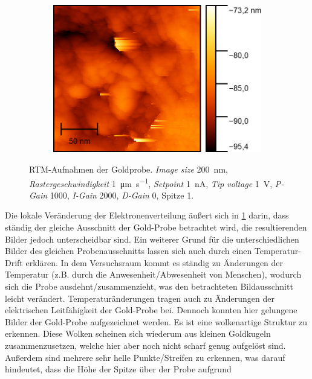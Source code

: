 \begin{figure}[H]
\begin{subfigure}{0.45\textwidth}
        \caption{}
    \end{subfigure}
    \begin{subfigure}{0.45\textwidth}
        \centering
        \includegraphics[width=\linewidth]{../figs/Gold10449}
        \caption{}
    \end{subfigure}
    \caption{RTM-Aufnahmen der Goldprobe. \textit{Image size} \SI{200}{\nano \meter}, \textit{Rastergeschwindigkeit} \SI{1}{\micro\m \per \second}, \textit{Setpoint} \SI{1}{\nano \ampere},
    \textit{Tip voltage} \SI{1}{\volt}, \textit{P-Gain} \num{1000}, \textit{I-Gain} \num{2000}, \textit{D-Gain} \num{0}, Spitze 1.}\label{fig:gold1}
\end{figure}
Die lokale Veränderung der Elektronenverteilung äußert sich in \cref{fig:gold1} darin, dass ständig der gleiche Ausschnitt der Gold-Probe betrachtet wird,
die resultierenden Bilder jedoch unterscheidbar sind. Ein weiterer Grund für die unterschiedlichen Bilder des gleichen Probenausschnitts lassen sich auch
durch einen Temperatur-Drift erklären. In dem Versuchsraum kommt es ständig zu Änderungen der Temperatur (z.B. durch die Anwesenheit/Abwesenheit von Menschen),
wodurch sich die Probe ausdehnt/zusammenzieht, was den betrachteten Bildausschnitt leicht verändert. Temperaturänderungen tragen auch zu Änderungen
der elektrischen Leitfähigkeit der Gold-Probe bei. Dennoch konnten hier gelungene Bilder der Gold-Probe aufgezeichnet werden. Es ist eine
wolkenartige Struktur zu erkennen. Diese Wolken scheinen sich wiederum aus kleinen Goldkugeln zusammenzusetzen, welche hier aber noch nicht
scharf genug aufgelöst sind. Außerdem sind mehrere sehr helle Punkte/Streifen zu erkennen, was darauf hindeutet, dass die Höhe der Spitze über der Probe aufgrund
